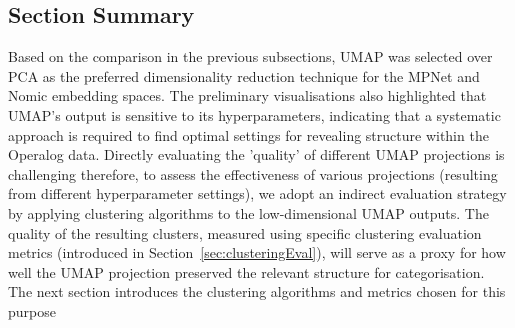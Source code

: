 \documentclass[10pt,oneside]{report}
\begin{document}
\subsection{Section Summary}

Based on the comparison in the previous subsections, UMAP was selected over PCA as the preferred dimensionality reduction technique for the MPNet and Nomic embedding spaces. The preliminary visualisations also highlighted that UMAP's output is sensitive to its hyperparameters, indicating that a systematic approach is required to find optimal settings for revealing structure within the Operalog data. Directly evaluating the 'quality' of different UMAP projections is challenging therefore, to assess the effectiveness of various projections (resulting from different hyperparameter settings), we adopt an indirect evaluation strategy by applying clustering algorithms to the low-dimensional UMAP outputs. The quality of the resulting clusters, measured using specific clustering evaluation metrics (introduced in Section~\ref{sec:clusteringEval}), will serve as a proxy for how well the UMAP projection preserved the relevant structure for categorisation. The next section introduces the clustering algorithms and metrics chosen for this purpose

\end{document}
